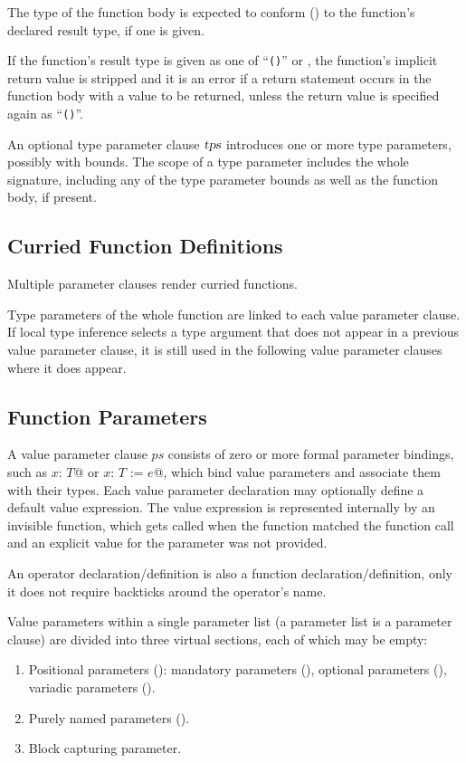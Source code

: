 The type of the function body is expected to conform () to the function's declared result type, if one is given. 

If the function's result type is given as one of ``\lstinline!()!'' or , the function's implicit return value is stripped and it is an error if a return statement occurs in the function body with a value to be returned, unless the return value is specified again as ``\lstinline!()!''.

An optional type parameter clause $\mbox{\sl tps}$ introduces one or more type parameters, possibly with bounds. The scope of a type parameter includes the whole signature, including any of the type parameter bounds as well as the function body, if present. 






\subsection{Curried Function Definitions}

Multiple parameter clauses render curried functions. 

Type parameters of the whole function are linked to each value parameter clause. If local type inference selects a type argument that does not appear in a previous value parameter clause, it is still used in the following value parameter clauses where it does appear. 






\subsection{Function Parameters}

A value parameter clause $ps$ consists of zero or more formal parameter bindings, such as \lstinline@$x$: $T$@ or \lstinline@$x$: $T$ := $e$@, which bind value parameters and associate them with their types. Each value parameter declaration may optionally define a default value expression. The value expression is represented internally by an invisible function, which gets called when the function matched the function call and an explicit value for the parameter was not provided.

An operator declaration/definition is also a function declaration/definition, only it does not require backticks around the operator's name. 

Value parameters within a single parameter list (a parameter list is a parameter clause) are divided into three virtual sections, each of which may be empty:
\begin{enumerate}
  \item Positional parameters (): mandatory parameters (), optional parameters (), variadic parameters (). 
  \item Purely named parameters (). 
  \item Block capturing parameter. 
\end{enumerate}




